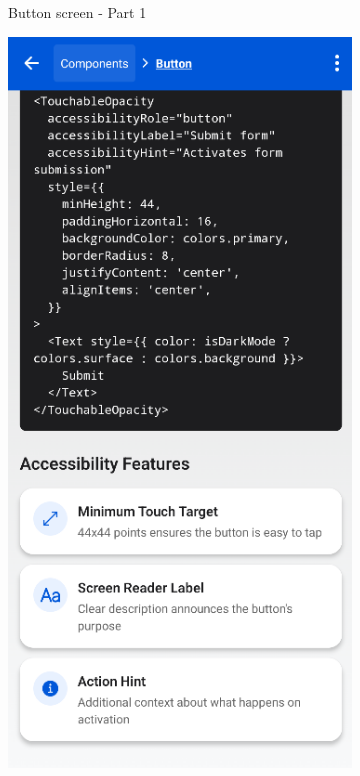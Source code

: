 \begin{enumerate}
\begin{itemize}
\begin{figure}[ht]
\begin{subfigure}[b]{0.48\textwidth}
                \caption{Button screen - Part 1}
                \label{fig:button-left}
            \end{subfigure}
            \hfill
            \begin{subfigure}[b]{0.48\textwidth}
                \centering
                \includegraphics[width=\linewidth, alt={Second part of the Buttons and touchables screen}]{img/button2.png}

\end{subfigure}
\end{figure}
\end{itemize}
\end{enumerate}
